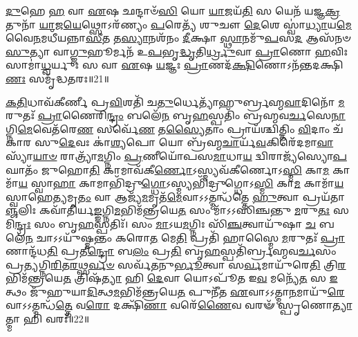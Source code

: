 \-\ul{𑌦𑍁}\-𑌹𑍇 \ul{𑌹} 𑌵𑌾 \ul{𑌏}\-𑌷 𑌛𑌨𑍍𑌦𑌾𑍞᳴\-\ul{𑌸𑌿} 𑌯𑍋 \ul{𑌯𑌾}\-𑌜𑌯᳴\-\ul{𑌤𑌿} 𑌸 𑌯𑍇𑌨᳴ 𑌯𑌜𑍍𑌞\-\ul{𑌕𑍍𑌰}\-𑌤𑍁𑌨𑌾᳴ \ul{𑌯𑌾}\-𑌜\-\ul{𑌯𑍇}\-𑌥𑍍𑌸𑍋𑌽𑌰᳴𑌣𑍍𑌯𑌂 \ul{𑌪}\-𑌰𑍇𑌤𑍍𑌯᳴ 𑌶𑍁𑌚𑍗 \ul{𑌦𑍇}\-𑌶𑍇 𑌸𑍍𑌵𑌾॑\-\ul{𑌧𑍍𑌯𑌾}\-𑌯\-\ul{𑌮𑍇}\-𑌵𑍈\-\ul{𑌨}\-𑌮𑌧𑍀᳴𑌯𑌨𑍍𑌨𑌾\-\ul{𑌸𑍀}\-𑌤 𑌤\-\ul{𑌸𑍍𑌯𑌾}\-𑌨𑌶᳴𑌨𑌂 \ul{𑌦𑍀}\-𑌕𑍍𑌷𑌾 \ul{𑌸𑍍𑌥𑌾}\-𑌨𑌮𑍁᳴\-\ul{𑌪}\-𑌸\-\ul{𑌦} 𑌆𑌸᳴𑌨𑍞 \ul{𑌸𑍁}\-𑌤𑍍𑌯𑌾 𑌵𑌾\-\ul{𑌗𑍍𑌜𑍁}\-𑌹𑍂𑌰𑍍𑌮𑌨᳴ 𑌉\-\ul{𑌪}\-𑌭𑍃\-\ul{𑌦𑍍𑌧𑍃}\-𑌤𑌿\-\ul{𑌰𑍍𑌧𑍍𑌰𑍁}\-𑌵𑌾 \ul{𑌪𑍍𑌰𑌾}\-𑌣𑍋 \ul{𑌹}\-𑌵𑌿𑌃 𑌸𑌾𑌮𑌾॑\-\ul{𑌧𑍍𑌵}\-𑌰𑍍𑌯𑍁𑌃 𑌸 𑌵𑌾 \ul{𑌏}\-𑌷 \ul{𑌯}\-𑌜𑍍𑌞𑌃 \ul{𑌪𑍍𑌰𑌾}\-𑌣𑌦᳴\-\ul{𑌕𑍍𑌷𑌿}\-𑌣𑍋𑌽𑌨᳴𑌨𑍍𑌤\-𑌦𑌕𑍍𑌷𑌿\-\ul{𑌣𑌃} 𑌸𑌮𑍃᳴𑌦𑍍𑌧𑌤𑌰𑌃॥21॥
\anuvakamend


\-\ul{𑌕}\-\-\ul{𑌤𑌿}\-𑌧𑌾𑌵᳴𑌕𑍀𑌰𑍍𑌣𑍀 𑌪𑍍𑌰\-\ul{𑌵𑌿}\-𑌶𑌤𑌿᳴ 𑌚\-\ul{𑌤𑍁}\-𑌰𑍍𑌧𑍇𑌤𑍍𑌯𑌾᳴𑌹𑍁𑌰𑍍𑌬𑍍𑌰𑌹𑍍𑌮\-\ul{𑌵𑌾}\-𑌦𑌿𑌨𑍋᳴ \ul{𑌮}\-𑌰𑍁𑌤𑌃᳴ \ul{𑌪𑍍𑌰𑌾}\-𑌣𑍈𑌰𑌿\-\ul{𑌨𑍍𑌦𑍍𑌰𑌂} 𑌬𑌲𑍇᳴\-\ul{𑌨} 𑌬𑍃\-\ul{𑌹}\-𑌸𑍍𑌪𑌤𑌿𑌂᳴ 𑌬𑍍𑌰𑌹𑍍𑌮𑌵\-\ul{𑌰𑍍𑌚}\-𑌸𑍇\-\ul{𑌨𑌾}\-𑌗𑍍𑌨𑌿\-\ul{𑌮𑍇}\-𑌵𑍇𑌤᳴𑌰𑍇\-\ul{𑌣} 𑌸𑌰𑍍𑌵𑍇᳴\-\ul{𑌣} 𑌤\-\ul{𑌸𑍍𑌯𑍈}\-𑌤𑌾𑌂 𑌪𑍍𑌰𑌾𑌯᳴𑌶𑍍𑌚𑌿𑌤𑍍𑌤𑌿𑌂 \ul{𑌵𑌿}\-𑌦𑌾𑌂 𑌚᳴𑌕𑌾𑌰 𑌸𑍁\-\ul{𑌦𑍇}\-𑌵𑌃 𑌕𑌾॑\-\ul{𑌶𑍍𑌯}\-𑌪𑍋 𑌯𑍋 𑌬𑍍𑌰᳴𑌹𑍍𑌮\-\ul{𑌚𑌾}\-𑌰𑍍𑌯᳴\-\ul{𑌵}\-𑌕𑌿𑌰𑍇᳴𑌦𑌮𑌾\-\ul{𑌵𑌾}\-𑌸𑍍𑌯𑌾᳴\-\ul{𑌯𑌾}\-\-\ul{𑍞} 𑌰𑌾𑌤𑍍𑌰𑍍𑌯𑌾᳴\-\ul{𑌮}\-𑌗𑍍𑌨𑌿𑌂 \ul{𑌪𑍍𑌰}\-𑌣𑍀𑌯𑍋᳴𑌪𑌸\-\ul{𑌮𑌾}\-𑌧𑌾\-\ul{𑌯} 𑌦𑍍𑌵𑌿𑌰𑌾𑌜𑍍𑌯᳴𑌸𑍍𑌯𑍋\-\ul{𑌪}\-𑌘𑌾𑌤𑌂᳴ 𑌜𑍁𑌹𑍋\-\ul{𑌤𑌿} 𑌕𑌾𑌮𑌾𑌵᳴𑌕𑍀\-\ul{𑌰𑍍𑌣𑍋}\-𑌽𑌸𑍍𑌮𑍍𑌯𑌵᳴𑌕𑍀𑌰𑍍𑌣𑍋𑌽\-\ul{𑌸𑍍𑌮𑌿} 𑌕𑌾\-\ul{𑌮} 𑌕𑌾𑌮𑌾᳴\-\ul{𑌯} 𑌸𑍍𑌵𑌾\-\ul{𑌹𑌾} 𑌕𑌾𑌮𑌾𑌭𑌿᳴𑌦𑍍𑌰𑍁\-\ul{𑌗𑍍𑌧𑍋}\-𑌽𑌸𑍍𑌮𑍍𑌯𑌭𑌿᳴𑌦𑍍𑌰𑍁𑌗𑍍𑌧𑍋𑌽\-\ul{𑌸𑍍𑌮𑌿} 𑌕𑌾\-\ul{𑌮} 𑌕𑌾𑌮𑌾᳴\-\ul{𑌯} 𑌸𑍍𑌵𑌾𑌹𑍇\-\ul{𑌤𑍍𑌯}\-𑌮𑍃\-\ul{𑌤𑌂} 𑌵𑌾 𑌆𑌜𑍍𑌯᳴\-\ul{𑌮}\-𑌮𑍃𑌤᳴\-\ul{𑌮𑍇}\-𑌵𑌾𑌽𑌽𑌤𑍍𑌮𑌨𑍍𑌧᳴𑌤𑍍𑌤𑍇 \ul{𑌹𑍁}\-𑌤𑍍𑌵𑌾 𑌪𑍍𑌰𑌯᳴𑌤𑌾\-\ul{𑌞𑍍𑌜}\-𑌲𑌿𑌃 𑌕𑌵𑌾᳴𑌤𑌿𑌰𑍍𑌯\-\ul{𑌙𑍍𑌙}\-𑌗𑍍𑌨𑌿\-\ul{𑌮}\-𑌭𑌿\-𑌮᳴𑌨𑍍𑌤𑍍𑌰𑌯𑍇\-\ul{𑌤} 𑌸𑌂 𑌮𑌾᳴𑌽𑌽𑌸𑌿𑌞𑍍𑌚𑌨𑍍𑌤𑍁 \ul{𑌮}\-𑌰𑍁\-\ul{𑌤𑌃} 𑌸𑌮𑌿\-\ul{𑌨𑍍𑌦𑍍𑌰𑌃} 𑌸𑌂 𑌬𑍃\-\ul{𑌹}\-𑌸𑍍𑌪𑌤𑌿𑌃᳴। 
𑌸𑌂 \ul{𑌮𑌾}\-𑌽𑌯\-\ul{𑌮}\-𑌗𑍍𑌨𑌿𑌃 𑌸𑌿᳴\-\ul{𑌞𑍍𑌚}\-𑌤𑍍𑌵𑌾𑌯𑍁᳴𑌷𑌾 \ul{𑌚} 𑌬𑌲𑍇᳴\-\ul{𑌨} 𑌚𑌾𑌽𑌽𑌯𑍁᳴𑌷𑍍𑌮𑌨𑍍𑌤𑌂 𑌕𑌰𑍋\-\ul{𑌤} 𑌮𑍇\-\ul{𑌤𑌿} 𑌪𑍍𑌰𑌤𑌿᳴ 𑌹𑌾𑌸𑍍𑌮𑍈 \ul{𑌮}\-𑌰𑍁𑌤𑌃᳴ \ul{𑌪𑍍𑌰𑌾}\-𑌣𑌾𑌨𑍍𑌦᳴𑌧\-\ul{𑌤𑌿} 𑌪𑍍𑌰𑌤𑍀\-\ul{𑌨𑍍𑌦𑍍𑌰𑍋} 𑌬\-\ul{𑌲𑌂} 𑌪𑍍𑌰\-\ul{𑌤𑌿} 𑌬𑍃\-\ul{𑌹}\-𑌸𑍍𑌪𑌤𑌿᳴𑌰𑍍𑌬𑍍𑌰𑌹𑍍𑌮𑌵\-\ul{𑌰𑍍𑌚}\-𑌸𑌂 𑌪𑍍𑌰\-\ul{𑌤𑍍𑌯}\-𑌗𑍍𑌨𑌿\-\ul{𑌰𑌿}\-𑌤\-\ul{𑌰}\-𑌥𑍍𑌸\-\ul{𑌰𑍍𑌵}\-\-\ul{𑍞} 𑌸𑌰𑍍𑌵᳴𑌤𑌨𑍁\-\ul{𑌰𑍍𑌭𑍂}\-𑌤𑍍𑌵𑌾 𑌸\-\ul{𑌰𑍍𑌵}\-𑌮𑌾𑌯𑍁᳴𑌰𑍇\-\ul{𑌤𑌿} 𑌤𑍍𑌰𑌿\-\ul{𑌰}\-𑌭𑌿𑌮᳴𑌨𑍍𑌤𑍍𑌰𑌯𑍇\-\ul{𑌤} 𑌤𑍍𑌰𑌿𑌷᳴\-\ul{𑌤𑍍𑌯𑌾} 𑌹𑌿 \ul{𑌦𑍇}\-𑌵𑌾 𑌯𑍋𑌽𑌪𑍂᳴𑌤 𑌇\-\ul{𑌵} 𑌮𑌨𑍍𑌯𑍇᳴\-\ul{𑌤} 𑌸 \ul{𑌇}\-𑌤𑍍𑌥𑌂 𑌜𑍁᳴𑌹𑍁𑌯𑌾\-\ul{𑌦𑌿}\-𑌤𑍍𑌥\-\ul{𑌮}\-𑌭𑌿𑌮᳴𑌨𑍍𑌤𑍍𑌰𑌯𑍇\-\ul{𑌤} 𑌪𑍁𑌨𑍀᳴𑌤 \ul{𑌏}\-𑌵𑌾𑌽𑌽𑌤𑍍𑌮𑌾\-\ul{𑌨}\-𑌮𑌾𑌯𑍁᳴\-\ul{𑌰𑍇}\-𑌵𑌾𑌽𑌽𑌤𑍍𑌮𑌨𑍍𑌧᳴\-\ul{𑌤𑍍𑌤𑍇} 𑌵\-\ul{𑌰𑍋} 𑌦𑌕𑍍𑌷𑌿᳴\-\ul{𑌣𑌾} 𑌵𑌰𑍇᳴\-\ul{𑌣𑍈}\-𑌵 𑌵𑌰𑍟᳴ 𑌸𑍍𑌪𑍃𑌣𑍋\-\ul{𑌤𑍍𑌯𑌾}\-𑌤𑍍𑌮𑌾 𑌹𑌿 𑌵𑌰𑌃᳴॥22॥
\anuvakamend

